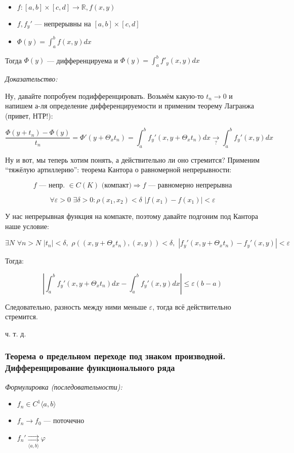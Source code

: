 \documentclass{article}
\def\dbl{\,\,}
\def\rsh#1{\underset{#1}{\rightrightarrows}}
\begin{document}
\begin{itemize}
    \item $f: [a, b] \times [c, d] \rightarrow \mathbb{R}, f(x, y)$
    \item $f, f_y'$ --- непрерывны на $[a, b] \times [c, d]$
    \item $\Phi(y) = \int_a^b f(x, y) dx$
\end{itemize}

Тогда $\Phi(y)$ --- дифференцируема и $\Phi(y) = \int_a^b f'_y(x, y) dx$

\textit{Доказательство:}

Ну, давайте попробуем подифференцировать. Возьмём какую-то $t_n \rightarrow 0$ и напишем а-ля определение дифференцируемости и применим теорему Лагранжа (привет, НТР!):

\[\frac{\Phi(y + t_n) - \Phi(y)}{t_n} = \Phi'(y + \Theta_x t_n) = \int_a^b f_y'(x, y + \Theta_x t_n) dx \underset{?}{\longrightarrow} \int_a^b f_y'(x, y) dx\]

Ну и вот, мы теперь хотим понять, а действительно ли оно стремится? Применим ``тяжёлую артиллерию'': теорема Кантора о равномерной непрерывности:

\[f \text{ --- непр. } \in C(K) \text{ (компакт)} \Rightarrow f\text{ --- равномерно непрерывна}\]

\[\forall \varepsilon > 0 \dbl \exists \delta > 0: \rho(x_1, x_2) < \delta \dbl |f(x_1) - f(x_1)| < \varepsilon\]

У нас непрерывная функция на компакте, поэтому давайте подгоним под Кантора наше условие:

\[\exists N \dbl \forall n > N \dbl |t_n| < \delta, \dbl \rho((x, y + \Theta_x t_n), (x, y)) < \delta, \dbl
\left|f_y'(x, y + \Theta_x t_n) - {f_y'(x, y)}\right| < \varepsilon\]

Тогда: 

\[\left|\int_a^b{f_y'(x, y + \Theta_x t_n) dx} - \int_a^b{f_y'(x, y) dx}\right| \le \varepsilon (b - a)\]

Следовательно, разность между ними меньше $\varepsilon$, тогда всё действительно стремится.

ч. т. д.

\subsubsection{Теорема о предельном переходе под знаком производной. Дифференцирование функционального ряда}
\textit{Формулировка (последовательности):}

\begin{itemize}
    \item $f_n \in C^1\langle a, b \rangle$
    \item $f_n \rightarrow f_0$ --- поточечно
    \item $f_n' \rsh{\langle a, b \rangle} \varphi$
\end{itemize}
\end{document}
